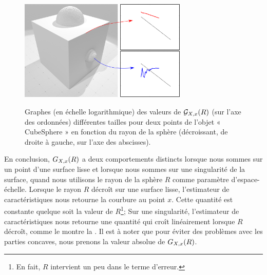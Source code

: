 \begin{figure}[ht]
\begin{center}
  {\includegraphics[width=8cm]{figures/CubeSpherePlot_ES_NoColor}}
  \caption{Graphes (en échelle logarithmique) des valeurs de $\mathcal{G}_{X,x}(R)$ (sur
  l'axe des ordonnées) différentes tailles pour deux points de l'objet «
  CubeSphere » en fonction du rayon de la sphère (décroissant, de droite
  à gauche, sur l'axe des abscisses).\label{fig:CubeSpherePlot_ES_NoColor}}
\end{center}
\end{figure}
%
En conclusion, $G_{X,x}(R)$ a deux comportements distincts lorsque nous sommes
sur un point d'une surface lisse et lorsque nous sommes sur une singularité de
la surface, quand nous utilisons le rayon de la sphère $R$ comme paramètre
d'espace-échelle. Lorsque le rayon $R$ décroît sur une surface lisse,
l'estimateur de caractéristiques nous retourne la courbure au point $x$. Cette
quantité est constante quelque soit la valeur de $R$\footnote{En fait, $R$
intervient un peu dans le terme d'erreur.}; Sur une singularité, l'estimateur de
caractéristiques nous retourne une quantité qui croît linéairement lorsque $R$
décroît, comme le montre la . Il est à
noter que pour éviter des problèmes avec les parties concaves, nous prenons la
valeur absolue de $G_{X,x}(R)$.
%
